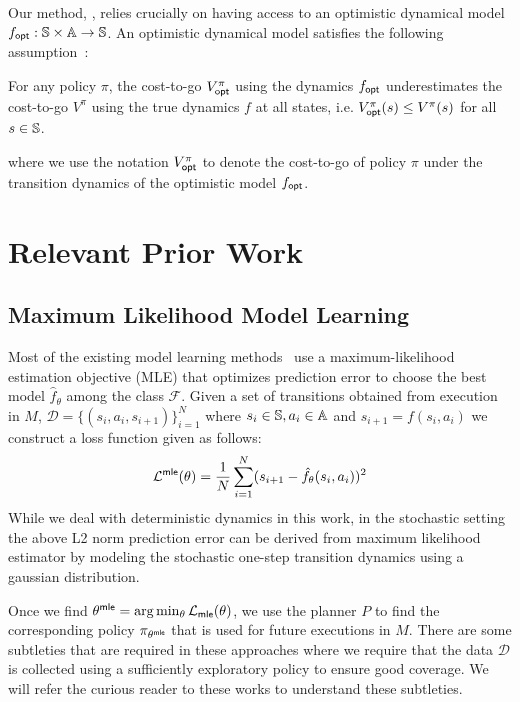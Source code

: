 Our method, \taml{}, relies crucially on having access to an
optimistic dynamical model $f_\mathsf{opt}: \mathbb{S} \times \mathbb{A}
\rightarrow \mathbb{S}$. An optimistic dynamical model satisfies
the following assumption~\cite{cmaxpp}:
\begin{assumption}
  For any policy $\pi$, the cost-to-go $V^\pi_{\mathsf{opt}}$ using the dynamics
  $f_\mathsf{opt}$ underestimates the cost-to-go $V^\pi$ using the true
  dynamics $f$ at all states, i.e. $V^\pi_{\mathsf{opt}}(s) \leq V^\pi(s)$ for
  all $s \in \mathbb{S}$.
  \label{assumption:taml-optimistic}
\end{assumption}
where we use the notation $V_{\mathsf{opt}}^\pi$ to denote the cost-to-go of
policy $\pi$ under the transition dynamics of the optimistic model
$f_\mathsf{opt}$.

\section{Relevant Prior Work}
\label{sec:prior-work}

\subsection{Maximum Likelihood Model Learning}
\label{sec:maxim-likel-model}

Most of the existing model learning
methods~\cite{DBLP:conf/nips/JannerFZL19,
  DBLP:conf/icra/NagabandiKFL18, DBLP:journals/corr/abs-1907-02057} use a maximum-likelihood
estimation objective (MLE) that optimizes prediction error to choose the best
model $\hat{f}_\theta$ among the class $\mathcal{F}$. Given a set of
transitions obtained from execution in $M$, $\mathcal{D} = \{(s_i, a_i,
s_{i+1})\}_{i=1}^N$ where $s_i \in \mathbb{S}, a_i \in \mathbb{A}$
and $s_{i+1} = f(s_i, a_i)$ we construct a loss function 
given as follows:
\begin{equation}
  \label{eq:21}
  \mathcal{L}^{\mathsf{mle}}(\theta) = \frac{1}{N} \sum_{i=1}^{N} (s_{i+1} -
  \hat{f}_\theta(s_i, a_i))^2
\end{equation}
While we deal with deterministic dynamics in this work, in the
stochastic setting the above L2 norm prediction error can be derived
from maximum likelihood estimator by modeling the stochastic one-step
transition dynamics using a gaussian distribution.

Once we find $\theta^{\mathsf{mle}} = \arg\min_{\theta}
\mathcal{L}_{\mathsf{mle}}(\theta)$, we use the planner $P$ to find the
corresponding policy $\pi_{\theta^{\mathsf{mle}}}$ that is used for future
executions in $M$. There are some subtleties that are required in
these approaches where we require that the data $\mathcal{D}$ is
collected using a sufficiently exploratory policy to ensure good
coverage. We will refer the curious reader to these works to
understand these subtleties.

